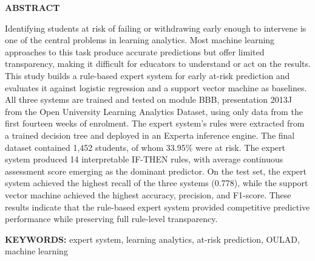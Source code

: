 \begin{center}
    \textbf{ABSTRACT}
\end{center}

\singlespacing

Identifying students at risk of failing or withdrawing early enough to intervene is one of the central problems in learning analytics. Most machine learning approaches to this task produce accurate predictions but offer limited transparency, making it difficult for educators to understand or act on the results. This study builds a rule-based expert system for early at-risk prediction and evaluates it against logistic regression and a support vector machine as baselines. All three systems are trained and tested on module BBB, presentation 2013J from the Open University Learning Analytics Dataset, using only data from the first fourteen weeks of enrolment. The expert system's rules were extracted from a trained decision tree and deployed in an Experta inference engine. The final dataset contained 1,452 students, of whom 33.95\% were at risk. The expert system produced 14 interpretable IF-THEN rules, with average continuous assessment score emerging as the dominant predictor. On the test set, the expert system achieved the highest recall of the three systems (0.778), while the support vector machine achieved the highest accuracy, precision, and F1-score. These results indicate that the rule-based expert system provided competitive predictive performance while preserving full rule-level transparency.

\vspace{0.5cm}

\noindent\textbf{KEYWORDS:} expert system, learning analytics, at-risk prediction, OULAD, machine learning
